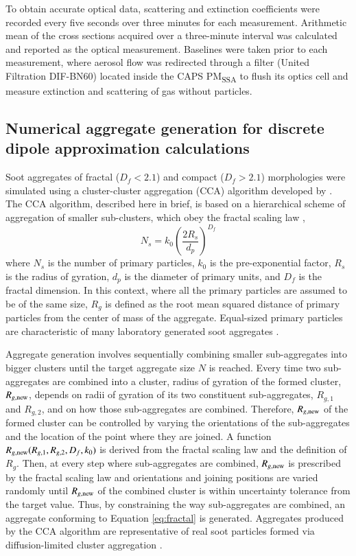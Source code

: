To obtain accurate optical data, scattering and extinction coefficients were recorded every five seconds over three minutes for each measurement. Arithmetic mean of the cross sections acquired over a three-minute interval was calculated and reported as the optical measurement. Baselines were taken prior to each measurement, where aerosol flow was redirected through a filter (United Filtration DIF-BN60) located inside the CAPS PM\textsubscript{SSA} to flush its optics cell and measure extinction and scattering of gas without particles.

\subsection{Numerical aggregate generation for discrete dipole approximation calculations}

Soot aggregates of fractal ($D_f < 2.1$) and compact ($D_f > 2.1$) morphologies were simulated using a cluster-cluster aggregation (CCA) algorithm developed by \citet{RN35}. The CCA algorithm, described here in brief, is based on a hierarchical scheme of aggregation of smaller sub-clusters, which obey the fractal scaling law \citep{jullien1987aggregation},
\begin{equation}
N_s=k_0\left(\frac{2R_s}{d_p}\right)^{D_f}
\label{eq:fractal}
\end{equation}
where $N_s$ is the number of primary particles, $k_0$ is the pre-exponential factor, $R_s$ is the radius of gyration, $d_p$ is the diameter of primary units, and $D_f$ is the fractal dimension. In this context, where all the primary particles are assumed to be of the same size, $R_g$ is defined as the root mean squared distance of primary particles from the center of mass of the aggregate. Equal-sized primary particles are characteristic of many laboratory generated soot aggregates \citep{RN22,RN25}.

Aggregate generation involves sequentially combining smaller sub-aggregates into bigger clusters until the target aggregate size $N$ is reached. Every time two sub-aggregates are combined into a cluster, radius of gyration of the formed cluster, $R_{g,\rm new}$, depends on radii of gyration of its two constituent sub-aggregates, $R_{g,1}$ and $R_{g,2}$, and on how those sub-aggregates are combined. Therefore, $R_{g,\rm new}$ of the formed cluster can be controlled by varying the orientations of the sub-aggregates and the location of the point where they are joined. A function $R_{g,\rm new}(R_{g,1},R_{g,2},D_f,k_0)$ is derived from the fractal scaling law and the definition of $R_g$. Then, at every step where sub-aggregates are combined, $R_{g,\rm new}$ is prescribed by the fractal scaling law and orientations and joining positions are varied randomly until $R_{g,\rm new}$ of the combined cluster is within uncertainty tolerance from the target value. Thus, by constraining the way sub-aggregates are combined, an aggregate conforming to Equation \ref{eq:fractal} is generated. Aggregates produced by the CCA algorithm are representative of real soot particles formed via diffusion-limited cluster aggregation \citep{RN36}.

